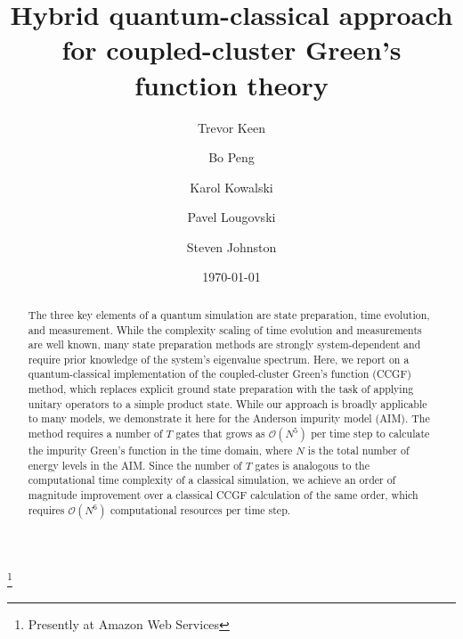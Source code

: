 \documentclass[aip,reprint,table,xcdraw,usenames,dvipsnames]{revtex4-1}
\begin{document}
\title{Hybrid quantum-classical approach for coupled-cluster Green's function theory}


\author{Trevor Keen} 
\address{Department of Physics and Astronomy, University of Tennessee, Knoxville, Tennessee 377996, United States of America}
\author{Bo Peng}
\address{Physical Sciences and Computational Division, Pacific Northwest National Laboratory, Richland, Washington 99354, United States of America}
\author{Karol Kowalski}
\address{Physical Sciences and Computational Division, Pacific Northwest National Laboratory, Richland, Washington 99354, United States of America}
\author{Pavel Lougovski}
\thanks{Presently at Amazon Web Services}
\address{Quantum Information Science Group, Computational Sciences and Engineering Division, Oak Ridge National Laboratory, Oak Ridge, Tennessee 37831, United States of America}
\author{Steven Johnston}
\address{Department of Physics and Astronomy, University of Tennessee, Knoxville, Tennessee 377996, United States of America}
\address{Institute for Advanced Materials and Manufacturing, University of Tennessee, Knoxville,  Tennessee 37996, United States of America}
\date{\today}

\begin{abstract}
The three key elements of a quantum simulation are state preparation, time evolution, and measurement. While the complexity scaling of time evolution and measurements are well known, many state preparation methods are strongly system-dependent and require prior knowledge of the system's eigenvalue spectrum. Here, we report on a quantum-classical implementation of the coupled-cluster Green's function (CCGF) method, which replaces explicit ground state preparation with the task of applying unitary operators to a simple product state.
While our approach is broadly applicable to many models, we demonstrate it here for the Anderson impurity model (AIM). The method requires a number of $T$ gates that grows as $ \mathcal{O} \left(N^5 \right)$ per time step to calculate the impurity Green's function in the time domain, where $N$ is the total number of energy levels in the AIM. Since the number of $T$ gates is analogous to the computational time complexity of a classical simulation, we achieve an order of magnitude improvement over a classical CCGF calculation of the same order, which requires $ \mathcal{O} \left(N^6 \right)$ computational resources per time step.
\end{abstract}
\end{document}
